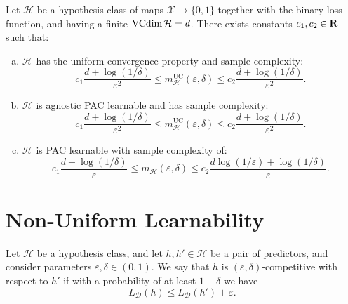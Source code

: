 \begin{theorem}
    \label{thm:finite-vc-dim-sample-complexity-estimation}
    Let \(\mathcal{H}\) be a hypothesis class of maps \(\mathcal{X} \to \{0, 1\}\) together with the
    binary loss function, and having a finite \(\operatorname{VCdim} \mathcal{H} = d\). There exists
    constants \(c_1, c_2 \in \mathbf{R}\) such that:
    \begin{enumerate}[(a)]\setlength\itemsep{0em}
        \item \(\mathcal{H}\) has the uniform convergence property and sample complexity:
              \[
                  c_1 \frac{d + \log(1/\delta)}{\varepsilon^2} \leq
                  m_{\mathcal{H}}^{\text{UC}}(\varepsilon, \delta) \leq
                  c_2 \frac{d + \log(1/\delta)}{\varepsilon^2}.
              \]

        \item \(\mathcal{H}\) is agnostic PAC learnable and has sample complexity:
              \[
                  c_1 \frac{d + \log(1/\delta)}{\varepsilon^2} \leq
                  m_{\mathcal{H}}^{\text{UC}}(\varepsilon, \delta) \leq
                  c_2 \frac{d + \log(1/\delta)}{\varepsilon^2}.
              \]

        \item \(\mathcal{H}\) is PAC learnable with sample complexity of:
              \[
                  c_1 \frac{d + \log(1/\delta)}{\varepsilon} \leq
                  m_{\mathcal{H}}(\varepsilon, \delta) \leq
                  c_2 \frac{d \log(1/\varepsilon) + \log(1/\delta)}{\varepsilon}.
              \]
    \end{enumerate}
\end{theorem}


\section{Non-Uniform Learnability}

\begin{definition}
    \label{def:competitive-hypothesis}
    Let \(\mathcal{H}\) be a hypothesis class, and let \(h, h' \in \mathcal{H}\) be a pair of predictors,
    and consider parameters \(\varepsilon, \delta \in (0, 1)\). We say that \(h\) is
    \((\varepsilon, \delta)\)-competitive with respect to \(h'\) if with a probability of at least
    \(1 - \delta\) we have
    \[
        L_{\mathcal{D}}(h) \leq L_{\mathcal{D}}(h') + \varepsilon.
    \]
\end{definition}

